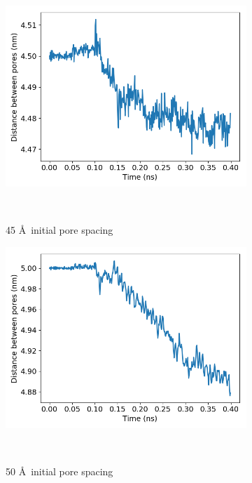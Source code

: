 \documentclass{article}
\begin{document}
\begin{figure}[!htb]
\begin{subfigure}{0.3\textwidth}
		\includegraphics[width=\textwidth]{p2p_45.png}
		\vspace{-1.25em}
		\caption{45 \AA~initial pore spacing}~\label{fig:p2p_45}
	\end{subfigure}
	\begin{subfigure}{0.3\textwidth}
		\includegraphics[width=\textwidth]{p2p_50.png}\quad	
		\vspace{-1.25em}
		\caption{50 \AA~initial pore spacing}~\label{fig:p2p_50}
	\end{subfigure}
	\begin{subfigure}{0.3\textwidth}

\end{subfigure}
\end{figure}
\end{document}
